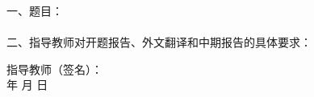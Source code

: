 
\newpage
\thispagestyle{empty}

\begin{tabbing}
\hspace{5mm}\songti\sihao 一、题目：\underline{\makebox[12cm]{}}
\\ \\
\hspace{5mm}\songti\sihao 二、指导教师对开题报告、外文翻译和中期报告的具体要求：
\end{tabbing}

\vspace{140mm}

\begin{tabbing}
\hspace{80mm}\songti\xiaosi 指导教师（签名）：
\\ \hspace{90mm} \songti\xiaosi 年 \hspace{5mm} \songti\xiaosi 月 \hspace{5mm} \songti\xiaosi 日
\end{tabbing}

